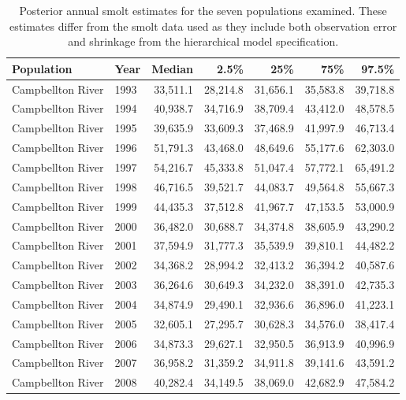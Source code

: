 \begingroup\footnotesize
\begin{longtable}{llrrrrr}
\caption{Posterior annual smolt estimates for the seven populations examined. These
                    estimates differ from the smolt data used as they include both observation error and shrinkage from
                    the hierarchical model specification.} \\ 
  \hline
Population & Year & Median & 2.5\% & 25\% & 75\% & 97.5\% \\ 
  \hline
Campbellton River & 1993 & 33,511.1 & 28,214.8 & 31,656.1 & 35,583.8 & 39,718.8 \\ 
  Campbellton River & 1994 & 40,938.7 & 34,716.9 & 38,709.4 & 43,412.0 & 48,578.5 \\ 
  Campbellton River & 1995 & 39,635.9 & 33,609.3 & 37,468.9 & 41,997.9 & 46,713.4 \\ 
  Campbellton River & 1996 & 51,791.3 & 43,468.0 & 48,649.6 & 55,177.6 & 62,303.0 \\ 
  Campbellton River & 1997 & 54,216.7 & 45,333.8 & 51,047.4 & 57,772.1 & 65,491.2 \\ 
  Campbellton River & 1998 & 46,716.5 & 39,521.7 & 44,083.7 & 49,564.8 & 55,667.3 \\ 
  Campbellton River & 1999 & 44,435.3 & 37,512.8 & 41,967.7 & 47,153.5 & 53,000.9 \\ 
  Campbellton River & 2000 & 36,482.0 & 30,688.7 & 34,374.8 & 38,605.9 & 43,290.2 \\ 
  Campbellton River & 2001 & 37,594.9 & 31,777.3 & 35,539.9 & 39,810.1 & 44,482.2 \\ 
  Campbellton River & 2002 & 34,368.2 & 28,994.2 & 32,413.2 & 36,394.2 & 40,587.6 \\ 
  Campbellton River & 2003 & 36,264.6 & 30,649.3 & 34,232.0 & 38,391.0 & 42,735.3 \\ 
  Campbellton River & 2004 & 34,874.9 & 29,490.1 & 32,936.6 & 36,896.0 & 41,223.1 \\ 
  Campbellton River & 2005 & 32,605.1 & 27,295.7 & 30,628.3 & 34,576.0 & 38,417.4 \\ 
  Campbellton River & 2006 & 34,873.3 & 29,627.1 & 32,950.5 & 36,913.9 & 40,996.9 \\ 
  Campbellton River & 2007 & 36,958.2 & 31,359.2 & 34,911.8 & 39,141.6 & 43,591.2 \\ 
  Campbellton River & 2008 & 40,282.4 & 34,149.5 & 38,069.0 & 42,682.9 & 47,584.2 \\ 

\end{longtable}
